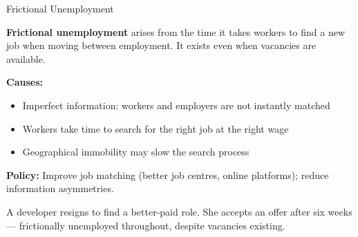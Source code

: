 \documentclass[16pt,aspectratio=169]{beamer}
\begin{document}
\begin{frame}{Frictional Unemployment}
    \begin{definition}
        \textbf{Frictional unemployment} arises from the time it takes workers to find a new job when moving between employment. It exists even when vacancies are available.
    \end{definition}

    \vspace{0.3em}
    \textbf{Causes:}
    \begin{itemize}
        \item Imperfect information: workers and employers are not instantly matched
        \item Workers take time to search for the right job at the right wage
        \item Geographical immobility may slow the search process
    \end{itemize}

    \vspace{0.2em}
    \textbf{Policy:} Improve job matching (better job centres, online platforms); reduce information asymmetries.

    \vspace{0.2em}
    \begin{example}
        A developer resigns to find a better-paid role. She accepts an offer after six weeks --- frictionally unemployed throughout, despite vacancies existing.
    \end{example}
\end{frame}
\end{document}
